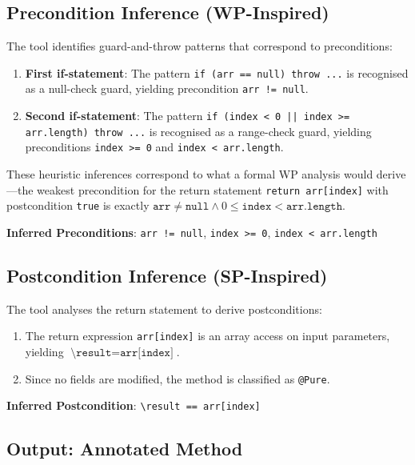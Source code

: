 \documentclass[11pt]{article}
\begin{document}
\subsection{Precondition Inference (WP-Inspired)}

The tool identifies guard-and-throw patterns that correspond to preconditions:

\begin{enumerate}
    \item \textbf{First if-statement}: The pattern \texttt{if (arr == null) throw ...} is recognised as a null-check guard, yielding precondition \texttt{arr != null}.

    \item \textbf{Second if-statement}: The pattern \texttt{if (index < 0 || index >= arr.length) throw ...} is recognised as a range-check guard, yielding preconditions \texttt{index >= 0} and \texttt{index < arr.length}.
\end{enumerate}

These heuristic inferences correspond to what a formal WP analysis would derive---the weakest precondition for the return statement \texttt{return arr[index]} with postcondition \texttt{true} is exactly $\texttt{arr} \neq \texttt{null} \land 0 \leq \texttt{index} < \texttt{arr.length}$.

\noindent\textbf{Inferred Preconditions}: \texttt{arr != null}, \texttt{index >= 0}, \texttt{index < arr.length}

\subsection{Postcondition Inference (SP-Inspired)}

The tool analyses the return statement to derive postconditions:

\begin{enumerate}
    \item The return expression \texttt{arr[index]} is an array access on input parameters, yielding $\texttt{\textbackslash result} = \texttt{arr[index]}$.
    \item Since no fields are modified, the method is classified as \texttt{@Pure}.
\end{enumerate}

\noindent\textbf{Inferred Postcondition}: \texttt{\textbackslash result == arr[index]}

\subsection{Output: Annotated Method}
\end{document}
